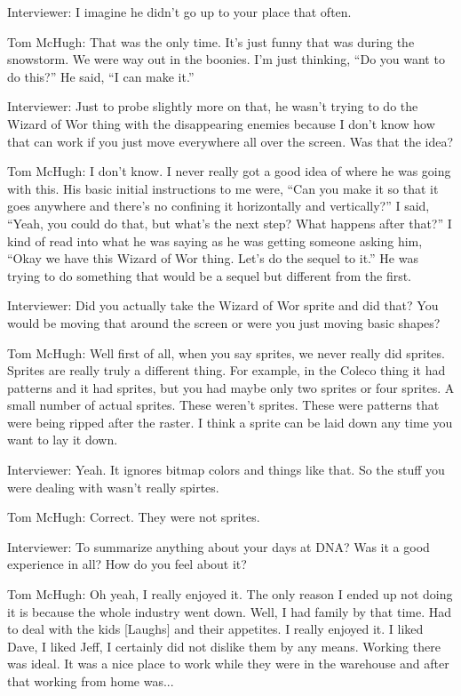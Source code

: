 \textcolor{interviewer}{Interviewer:} I imagine he didn’t go up to your place that often.

\textcolor{interviewee}{Tom McHugh:} That was the only time. It’s just funny that was during the snowstorm. We were way out in the boonies. I’m just thinking, “Do you want to do this?” He said, “I can make it.”

\textcolor{interviewer}{Interviewer:} Just to probe slightly more on that, he wasn’t trying to do the Wizard of Wor thing with the disappearing enemies because I don’t know how that can work if you just move everywhere all over the screen. Was that the idea?

\textcolor{interviewee}{Tom McHugh:} I don’t know. I never really got a good idea of where he was going with this. His basic initial instructions to me were, “Can you make it so that it goes anywhere and there’s no confining it horizontally and vertically?” I said, “Yeah, you could do that, but what’s the next step? What happens after that?” I kind of read into what he was saying as he was getting someone asking him, “Okay we have this Wizard of Wor thing. Let’s do the sequel to it.” He was trying to do something that would be a sequel but different from the first.

\textcolor{interviewer}{Interviewer:} Did you actually take the Wizard of Wor sprite and did that? You would be moving that around the screen or were you just moving basic shapes?

\textcolor{interviewee}{Tom McHugh:} Well first of all, when you say sprites, we never really did sprites. Sprites are really truly a different thing. For example, in the Coleco thing it had patterns and it had sprites, but you had maybe only two sprites or four sprites. A small number of actual sprites. These weren’t sprites. These were patterns that were being ripped after the raster. I think a sprite can be laid down any time you want to lay it down.

\textcolor{interviewer}{Interviewer:} Yeah. It ignores bitmap colors and things like that. So the stuff you were dealing with wasn’t really spirtes.

\textcolor{interviewee}{Tom McHugh:} Correct. They were not sprites.

\textcolor{interviewer}{Interviewer:} To summarize anything about your days at DNA? Was it a good experience in all? How do you feel about it?

\textcolor{interviewee}{Tom McHugh:} Oh yeah, I really enjoyed it. The only reason I ended up not doing it is because the whole industry went down. Well, I had family by that time. Had to deal with the kids [Laughs] and their appetites. I really enjoyed it. I liked Dave, I liked Jeff, I certainly did not dislike them by any means. Working there was ideal. It was a nice place to work while they were in the warehouse and after that working from home was...

